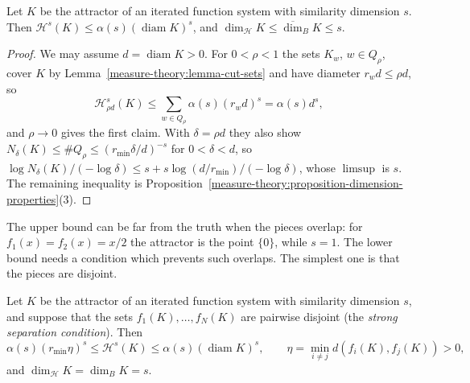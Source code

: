 \begin{proposition}\label{measure-theory:proposition-similarity-upper}
Let $K$ be the attractor of an iterated function system with similarity dimension $s$. Then $\mathcal{H}^s(K) \leq \alpha(s)(\operatorname{diam}K)^s$, and $\dim_{\mathcal{H}}K \leq \overline{\dim}_BK \leq s$.
\end{proposition}

\begin{proof}
We may assume $d = \operatorname{diam}K > 0$. For $0 < \rho < 1$ the sets $K_w$, $w \in Q_\rho$, cover $K$ by Lemma~\ref{measure-theory:lemma-cut-sets} and have diameter
$r_wd \leq \rho d$, so
\[
\mathcal{H}^s_{\rho d}(K) \leq \sum_{w \in Q_\rho}\alpha(s)(r_wd)^s = \alpha(s)d^s,
\]
and $\rho \to 0$ gives the first claim. With $\delta = \rho d$ they also show $N_\delta(K) \leq \#Q_\rho \leq (r_{\min}\delta/d)^{-s}$ for $0 < \delta < d$, so
$\log N_\delta(K)/(-\log\delta) \leq s + s\log(d/r_{\min})/(-\log\delta)$, whose $\limsup$ is $s$. The remaining inequality is
Proposition~\ref{measure-theory:proposition-dimension-properties}(3).
\end{proof}

The upper bound can be far from the truth when the pieces overlap: for $f_1(x) = f_2(x) = x/2$ the attractor is the point $\{0\}$, while $s = 1$. The lower bound needs a condition which prevents such
overlaps. The simplest one is that the pieces are disjoint.

\begin{theorem}\label{measure-theory:theorem-moran}
Let $K$ be the attractor of an iterated function system with similarity dimension $s$, and suppose that the sets $f_1(K), \ldots, f_N(K)$ are pairwise disjoint (the \emph{strong separation condition}).
Then
\[
\alpha(s)(r_{\min}\eta)^s \leq \mathcal{H}^s(K) \leq \alpha(s)(\operatorname{diam}K)^s, \qquad \eta = \min_{i \neq j}d(f_i(K), f_j(K)) > 0,
\]
and $\dim_{\mathcal{H}}K = \dim_BK = s$.
\end{theorem}

